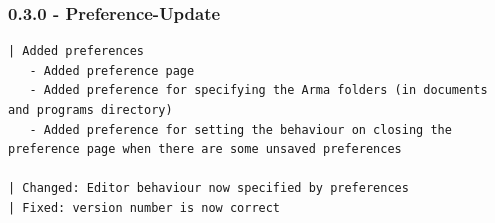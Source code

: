 \documentclass[twoside=false]{scrbook}
\begin{document}
	\subsubsection*{0.3.0 - Preference-Update}
	\begin{lstlisting}[breaklines=true]
| Added preferences
   - Added preference page
   - Added preference for specifying the Arma folders (in documents and programs directory)
   - Added preference for setting the behaviour on closing the preference page when there are some unsaved preferences
		
| Changed: Editor behaviour now specified by preferences
| Fixed: version number is now correct
	\end{lstlisting}
	
\end{document}
